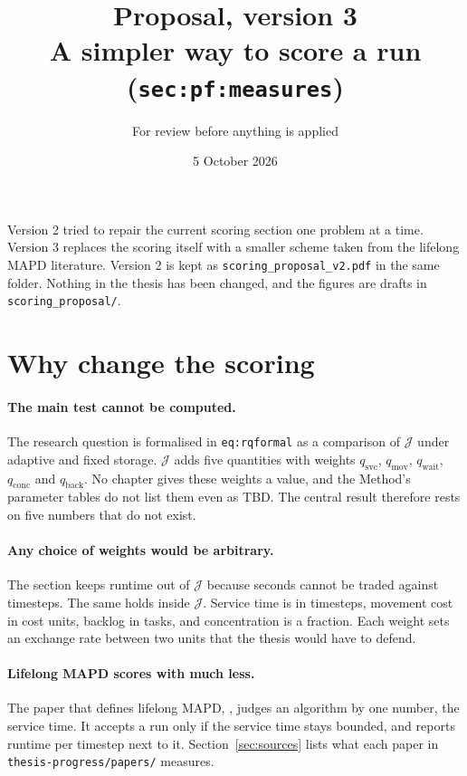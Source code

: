 \documentclass[11pt,a4paper]{article}
\title{Proposal, version 3\\[2pt]\large A simpler way to score a run (\texttt{sec:pf:measures})}
\author{For review before anything is applied}
\date{5 October 2026}
\begin{document}
\sloppy
\maketitle

\noindent Version 2 tried to repair the current scoring section one
problem at a time. Version 3 replaces the scoring itself with a smaller
scheme taken from the lifelong MAPD literature. Version 2 is kept as
\texttt{scoring\_proposal\_v2.pdf} in the same folder. Nothing in the thesis
has been changed, and the figures are drafts in \texttt{scoring\_proposal/}.

\tableofcontents

\section{Why change the scoring}
\label{sec:why}

\paragraph{The main test cannot be computed.} The research question is
formalised in \texttt{eq:rqformal} as a comparison of $\mathcal{J}$ under
adaptive and fixed storage. $\mathcal{J}$ adds five quantities with
weights $q_{\mathrm{svc}}$, $q_{\mathrm{mov}}$, $q_{\mathrm{wait}}$,
$q_{\mathrm{conc}}$ and $q_{\mathrm{back}}$. No chapter gives these
weights a value, and the Method's parameter tables do not list them even
as TBD. The central result therefore rests on five numbers that do not
exist.

\paragraph{Any choice of weights would be arbitrary.} The section keeps
runtime out of $\mathcal{J}$ because seconds cannot be traded against
timesteps. The same holds inside $\mathcal{J}$. Service time is in
timesteps, movement cost in cost units, backlog in tasks, and
concentration is a fraction. Each weight sets an exchange rate between two
units that the thesis would have to defend.

\paragraph{Lifelong MAPD scores with much less.} The paper that defines
lifelong MAPD, \citet{ma2017lifelong_mapf}, judges an algorithm by one
number, the service time. It accepts a run only if the service time stays
bounded, and reports runtime per timestep next to it.
Section~\ref{sec:sources} lists what each paper in
\texttt{thesis-progress/papers/} measures.
\end{document}
